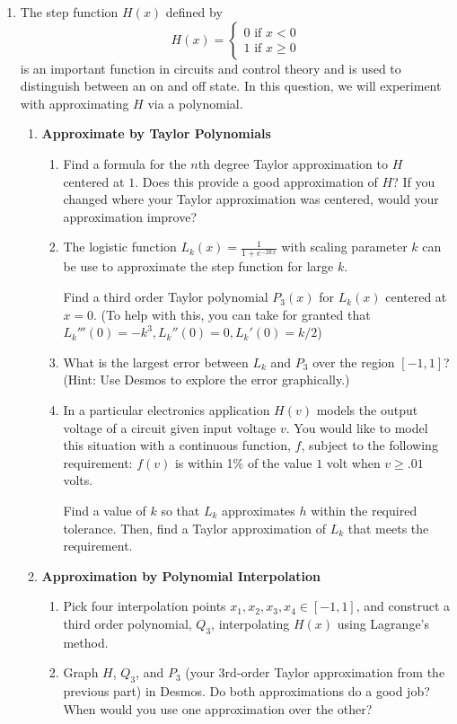 \begin{enumerate}
	\item The step function $H(x)$  defined by
	      \[
		      H(x) = \begin{cases}
			      0  \text{ if } x < 0 \\
			      1 \text { if } x \geq 0
		      \end{cases}
	      \]
	      is an important function in circuits and control theory
	      and is used to distinguish between an on and off state.
		  In this question, we will experiment with approximating $H$ via a polynomial.
	      \begin{enumerate}
		      \item \textbf{Approximate by Taylor Polynomials}
		            \begin{enumerate}
						\item Find a formula for the $n$th degree Taylor approximation to $H$ centered 
						at $1$. Does this provide a good approximation of $H$? If you changed where your
						Taylor approximation was centered, would your approximation improve?
			            \item The logistic function $L_k(x) = \frac{1}{1+e^{-2kx}}$ with scaling parameter $k$ 
						can be use to approximate the step function for large $k$.
						
						Find a third order Taylor polynomial $P_3(x)$ for $L_k(x)$ centered at $x=0$. (To help with this, you can take for granted that $L_k'''(0) = -k^3, L_k''(0) =0, L_k'(0)=k/2$)
			            \item What is the largest error between 
						$L_k$ and $P_3$ over the region $[-1,1]$? (Hint: Use Desmos to explore the error graphically.)

						\item In a particular electronics application $H(v)$ models the output 
						voltage of a circuit given input voltage $v$. You would like to model 
						this situation with a continuous function, $f$, subject to the following requirement:
						$f(v)$ is within 1\% of the value $1$ volt when $v\geq .01$ volts.

						Find a value of $k$ so that $L_k$ approximates $h$ within the required tolerance.
						Then, find a Taylor approximation of $L_k$ that meets the requirement.
		            \end{enumerate}


		      \item \textbf{Approximation by Polynomial Interpolation}

		            \begin{enumerate}
			            \item Pick four interpolation points $x_1,x_2,x_3,x_4 \in [-1,1]$, and construct a third order polynomial, $Q_3$, interpolating $H(x)$ using Lagrange's method.
			            \item Graph $H$, $Q_3$, and $P_3$ (your 3rd-order Taylor approximation from the previous part) in Desmos.
						Do both approximations do a good job? When would you use one approximation over the other?
		            \end{enumerate}


\end{enumerate}
\end{enumerate}

